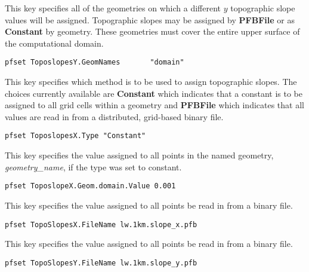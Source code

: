 {
This key specifies all of the geometries on which a different $y$ topographic slope values will be 
assigned.  Topographic slopes may be assigned by {\bf PFBFile} or as {\bf Constant} by geometry.  These geometries must cover the entire upper surface of the computational domain.
}
\begin{display}\begin{verbatim}
pfset ToposlopesY.GeomNames       "domain"
\end{verbatim}\end{display}

{
This key specifies which method is to be used to assign topographic slopes.  The choices currently
available are {\bf Constant} which indicates that a constant is to be
assigned to all grid cells within a geometry and {\bf PFBFile} which indicates that all values are read in from a distributed, grid-based \parflow{} binary file.
}
\begin{display}\begin{verbatim}
pfset ToposlopesX.Type "Constant"
\end{verbatim}\end{display}

{
This key specifies the value assigned to all points in the named
geometry, {\em geometry\_name}, if the type was set to constant.
}
\begin{display}\begin{verbatim}
pfset ToposlopeX.Geom.domain.Value 0.001
\end{verbatim}\end{display}

{
This key specifies the value assigned to all points be read in from a \parflow{} binary file.
}
\begin{display}\begin{verbatim}
pfset TopoSlopesX.FileName lw.1km.slope_x.pfb
\end{verbatim}\end{display}

{
This key specifies the value assigned to all points be read in from a \parflow{} binary file.
}
\begin{display}\begin{verbatim}
pfset TopoSlopesY.FileName lw.1km.slope_y.pfb
\end{verbatim}\end{display}

